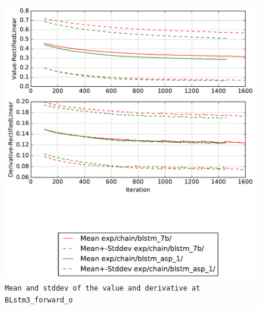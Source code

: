 \documentclass[prl,10pt,twocolumn]{revtex4}
\begin{document}
\newpage
\begin{figure}[h]
  \begin{center}
    \caption{\texttt{Mean and stddev of the value and derivative at BLstm3\_forward\_o}}
    \includegraphics[width=\textwidth]{exp/chain/blstm_7b/report/nonlinstats_BLstm3_forward_o.pdf}
  \end{center}
\end{figure}
\clearpage
\end{document}
